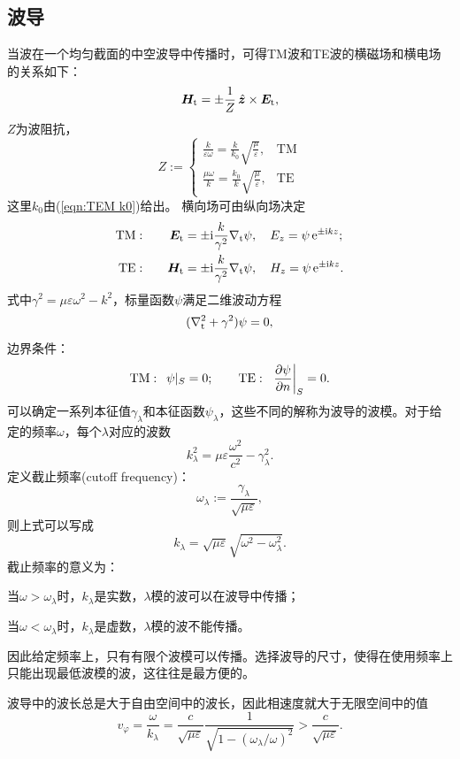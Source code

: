 \subsection{波导}
当波在一个均匀截面的中空波导中传播时，可得TM波和TE波的横磁场和横电场的关系如下：
\[
    \bm H_\text t=\pm\frac1Z\mathop{}\!\hat{\bm z}\times\bm E_\text t,
\]
$Z$为波阻抗，
\[
    Z:=\begin{cases}
        \frac k{\varepsilon\omega}=\frac k{k_0}\sqrt{\frac\mu\varepsilon},&\text{TM}\\
        \frac {\mu\omega}k=\frac {k_0}k\sqrt{\frac\mu\varepsilon},&\text{TE}
    \end{cases}
\]
这里$k_0$由(\ref{eqn:TEM k0})给出。
横向场可由纵向场决定
\begin{alignat*}{2}
    \text{TM}&:\quad&\bm E_\text t&=\pm\mathrm{i}\frac k{\gamma^2}\nabla_\text t\psi,\quad E_z=\psi\mathop{}\!\mathrm{e}^{\pm\mathrm{i} kz};\\
    \text{TE}&:\quad&\bm H_\text t&=\pm\mathrm{i}\frac k{\gamma^2}\nabla_\text t\psi,\quad H_z=\psi\mathop{}\!\mathrm{e}^{\pm\mathrm{i} kz}.
\end{alignat*}
式中$\gamma^2=\mu\varepsilon\omega^2-k^2$，标量函数$\psi$满足二维波动方程
\[
    (\nabla^2_\text t+\gamma^2)\psi=0,
\]
边界条件：
\[
    \text{TM}:\enspace\psi|_S=0;\qquad\text{TE}:\enspace\left.\frac{\partial^{\;\!\!}\psi}{\partial n^{\;\!\!}}\right\rvert_S=0.
\]
可以确定一系列本征值$\gamma_\lambda$和本征函数$\psi_\lambda$，这些不同的解称为波导的波模。对于给定的频率$\omega$，每个$\lambda$对应的波数
\[
    k_\lambda^2=\mu\varepsilon\frac{\omega^2}{c^2}-\gamma_\lambda^2.
\]
定义截止频率(cutoff frequency)：
\begin{equation}
    \label{eqn:cutoff omega}
    \omega_\lambda:=\frac{\gamma_\lambda}{\sqrt{\mu\varepsilon}},
\end{equation}
则上式可以写成
\[
    k_\lambda=\sqrt{\mu\varepsilon}\sqrt{\omega^2-\omega_\lambda^2}.
\]
截止频率的意义为：
\begin{compactitem}
    \item 当$\omega>\omega_\lambda$时，$k_\lambda$是实数，$\lambda$模的波可以在波导中传播；
    \item 当$\omega<\omega_\lambda$时，$k_\lambda$是虚数，$\lambda$模的波不能传播。
\end{compactitem}
因此给定频率上，只有有限个波模可以传播。选择波导的尺寸，使得在使用频率上只能出现最低波模的波，这往往是最方便的。

波导中的波长总是大于自由空间中的波长，因此相速度就大于无限空间中的值
\[
    v_\varphi=\frac\omega{k_\lambda}=\frac c{\sqrt{\mu\varepsilon}}\frac1{\sqrt{1-(\omega_\lambda/\omega)^2}}>\frac c{\sqrt{\mu\varepsilon}}.
\]
